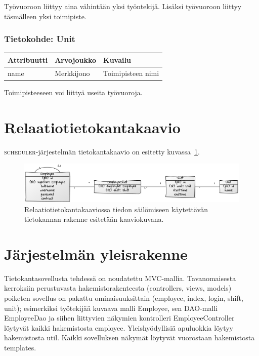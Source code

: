 \documentclass[10pt,titlepage,hidelinks]{scrartcl}
\newcommand{\scheduler}{\textsc{scheduler}}
\begin{document}
\noindent Työvuoroon liittyy aina vähintään yksi työntekijä. Lisäksi työvuoroon liittyy täsmälleen yksi toimipiste.

\subsubsection*{Tietokohde: Unit}
{\footnotesize \begin{tabu} to 
\toprule
Attribuutti & Arvojoukko & Kuvailu \\
\midrule
name & Merkkijono & Toimipisteen nimi \\
\bottomrule
\end{tabu}}\smallskip

\noindent Toimipisteeseen voi liittyä useita työvuoroja.

\section{Relaatiotietokantakaavio}

\scheduler{}-järjestelmän tietokantakaavio on esitetty kuvassa~\ref{fig:tietokantakaavio}.

\begin{figure}[tb]
\centering
\includegraphics[width=\textwidth]{af410d18}
\caption{Relaatiotietokantakaaviossa tiedon säilömiseen käytettävän tietokannan rakenne esitetään kaaviokuvana.}
\label{fig:tietokantakaavio}
\end{figure}

\section{Järjestelmän yleisrakenne}

Tietokantasovellusta tehdessä on noudatettu MVC-mallia. Tavanomaisesta kerroksiin perustuvasta hakemistorakenteesta (controllers, views, models) poiketen sovellus on pakattu ominaisuuksittain (employee, index, login, shift, unit); esimerkiksi työtekijää kuvaava malli Employee, sen DAO-malli EmployeeDao ja siihen liittyvien näkymien kontrolleri EmployeeController löytyvät kaikki hakemistosta employee. Yleishyödyllisiä apuluokkia löytyy hakemistosta util. Kaikki sovelluksen näkymät löytyvät vuorostaan hakemistosta templates.
\end{document}
